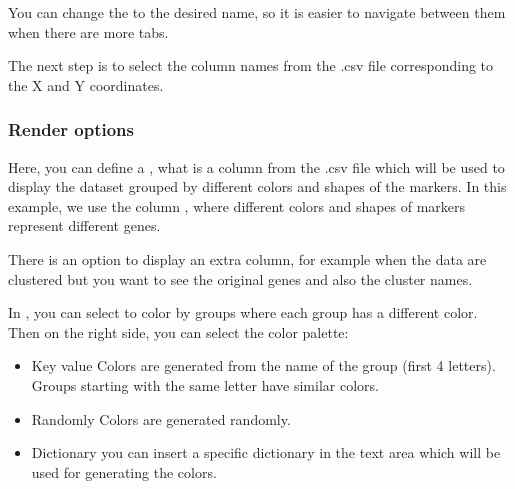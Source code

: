 \documentclass[letterpaper,10pt,english,openany,oneside]{sphinxmanual}
\begin{document}
\sphinxAtStartPar
{}

\sphinxAtStartPar
You can change the  to the desired name, so it is easier to navigate between them when there are more tabs.

\sphinxAtStartPar
{}

\sphinxAtStartPar
The next step is to select the column names from the .csv file corresponding to the X and Y coordinates.

\sphinxAtStartPar
{}


\subsubsection{Render options}
\label{\detokenize{docs/starting/markers:render-options}}
\sphinxAtStartPar
Here, you can define a , what is a column from the .csv file which will be used to display the dataset grouped by different colors and shapes of the markers. In this example, we use the column , where different colors and shapes of markers represent different genes.

\sphinxAtStartPar
{}

\sphinxAtStartPar
There is an option to display an extra column, for example when the data are clustered but you want to see the original genes and also the cluster names.

\sphinxAtStartPar
{}

\sphinxAtStartPar
In , you can select to color by groups where each group has a different color. Then on the right side, you can select the color palette:
\begin{itemize}
\item {} 
\sphinxAtStartPar
Key value \sphinxhyphen{} Colors are generated from the name of the group (first 4 letters). Groups starting with the same letter have similar colors.

\item {} 
\sphinxAtStartPar
Randomly \sphinxhyphen{} Colors are generated randomly.

\item {} 
\sphinxAtStartPar
Dictionary \sphinxhyphen{} you can insert a specific dictionary in the text area which will be used for generating the colors.

\end{itemize}
\end{document}
